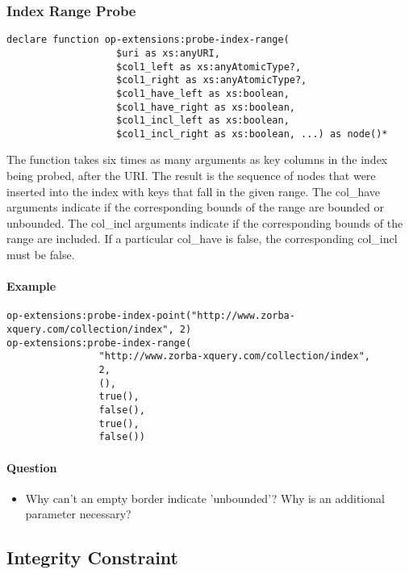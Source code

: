 \documentclass[]{article}
\begin{document}
\subsubsection{Index Range Probe}
\begin{verbatim}
declare function op-extensions:probe-index-range(
                   $uri as xs:anyURI,
                   $col1_left as xs:anyAtomicType?,
                   $col1_right as xs:anyAtomicType?,
                   $col1_have_left as xs:boolean,
                   $col1_have_right as xs:boolean,
                   $col1_incl_left as xs:boolean,
                   $col1_incl_right as xs:boolean, ...) as node()*
\end{verbatim}

\noindent
The function takes six times as many arguments as key columns in the index being probed, after the URI. The result is the sequence of nodes that were inserted into the index with keys that fall in the given range. The col\_have arguments indicate if the corresponding bounds of the range are bounded or unbounded. The col\_incl arguments indicate if the corresponding bounds of the range are included. If a particular col\_have is false, the corresponding col\_incl must be false.


\paragraph{Example}
\begin{verbatim}
op-extensions:probe-index-point("http://www.zorba-xquery.com/collection/index", 2)
op-extensions:probe-index-range(
                "http://www.zorba-xquery.com/collection/index",
                2,
                (),
                true(),
                false(),
                true(),
                false())
\end{verbatim}

\paragraph{Question}
\begin{itemize}
\item Why can't an empty border indicate 'unbounded'? Why is an additional parameter necessary?
\end{itemize}

\subsection{Integrity Constraint}
\end{document}

